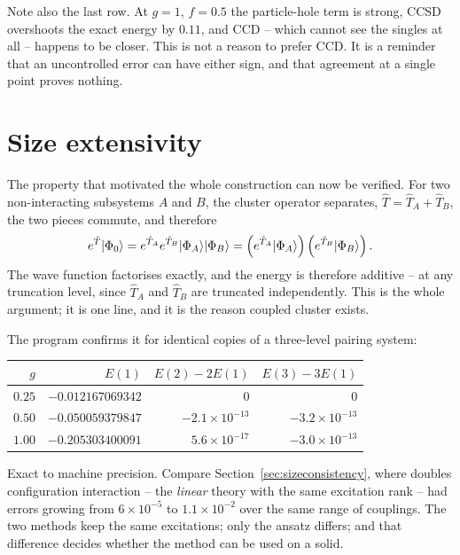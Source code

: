 Note also the last row.  At $g=1$, $f=0.5$ the particle-hole term is strong,
CCSD overshoots the exact energy by $0.11$, and CCD -- which cannot see the
singles at all -- happens to be closer.  This is not a reason to prefer CCD.
It is a reminder that an uncontrolled error can have either sign, and that
agreement at a single point proves nothing.

\section{Size extensivity}
\label{sec:ccextensivity}

The property that motivated the whole construction can now be verified.  For
two non-interacting subsystems $A$ and $B$, the cluster operator separates,
$\hat{T}=\hat{T}_A+\hat{T}_B$, the two pieces commute, and therefore
\begin{equation}
  e^{\hat{T}}\vert \Phi_0 \rangle
   = e^{\hat{T}_A}e^{\hat{T}_B}\vert \Phi_A \rangle\vert \Phi_B \rangle
   = \left(e^{\hat{T}_A}\vert \Phi_A \rangle\right)
     \left(e^{\hat{T}_B}\vert \Phi_B \rangle\right).
  \label{eq:10-factorises}
\end{equation}
The wave function factorises exactly, and the energy is therefore additive --
at any truncation level, since $\hat{T}_A$ and $\hat{T}_B$ are truncated
independently.  This is the whole argument; it is one line, and it is the
reason coupled cluster exists.

The program confirms it for identical copies of a three-level pairing system:

\begin{center}
\renewcommand{\arraystretch}{1.2}
\setlength{\tabcolsep}{11pt}
\begin{tabular}{rrrr}
\toprule
$g$ & $E(1)$ & $E(2)-2E(1)$ & $E(3)-3E(1)$\\
\midrule
$0.25$ & $-0.012167069342$ & $0$ & $0$\\
$0.50$ & $-0.050059379847$ & $-2.1\times10^{-13}$ & $-3.2\times10^{-13}$\\
$1.00$ & $-0.205303400091$ & $\phantom{-}5.6\times10^{-17}$
  & $-3.0\times10^{-13}$\\
\bottomrule
\end{tabular}
\end{center}

Exact to machine precision.  Compare Section~\ref{sec:sizeconsistency},
where doubles configuration interaction -- the \emph{linear} theory with the
same excitation rank -- had errors growing from $6\times10^{-5}$ to
$1.1\times10^{-2}$ over the same range of couplings.  The
two methods keep the same excitations; only the ansatz differs; and that
difference decides whether the method can be used on a solid.

